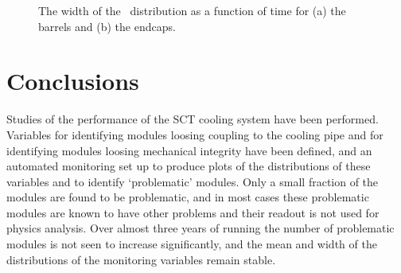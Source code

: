\begin{figure}[h]
 	\centering
  \caption{The width of the \tdiff\ distribution as a function of time for (a)
  the barrels and (b) the endcaps.}
	\label{fig:sigma-evo-tavg}
\end{figure}

\section{Conclusions}

Studies of the performance of the SCT cooling system have been performed. 
Variables for identifying modules
loosing coupling to the cooling pipe and for identifying modules loosing
mechanical integrity have been defined, and an automated monitoring set up to
produce plots of the distributions of these variables and to
identify `problematic' modules. Only a small fraction of the modules are found
to be problematic, and in  most cases these problematic modules are known to have other
problems and their readout is not used for physics analysis. Over almost three years of
running the number of problematic modules is not seen to increase significantly,
and the mean and width of the distributions of the monitoring variables remain
stable.

